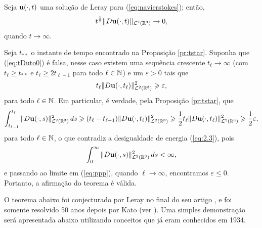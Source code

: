 \begin{tbox} \label{thm:Duto0}
    Seja $\mathbf{u}(\cdot,t)$ uma solução de Leray para (\ref{eq:navierstokes}); então,
    \begin{equation} \label{eq:tDuto0}
        t^{\frac{1}{2}} \Vert D\mathbf{u}(\cdot,t) \Vert_{\mathcal{L}^2(\mathbb{R}^3)} \to 0,
    \end{equation}
    quando $t \to \infty$.
\end{tbox}
\begin{prf}
    Seja $t_{**}$ o instante de tempo encontrado na Proposição \ref{pr:tstar}. Suponha que (\ref{eq:tDuto0}) é falsa, nesse caso existem uma sequência crescente $t_\ell \to \infty$ (com $t_\ell \geqslant t_{**}$ e $t_\ell \geqslant 2 t_{\ell -1}$ para todo $\ell \in \mathbb{N}$) e um $\varepsilon > 0$ tais que
    \[
        t_\ell \Vert D\mathbf{u}(\cdot,t_\ell) \Vert_{\mathcal{L}^2(\mathbb{R}^3)}^2 \geqslant \varepsilon,
    \]
    para todo $\ell \in \mathbb{N}$.
    Em particular, é verdade, pela Proposição \ref{pr:tstar}, que
    \begin{equation} \label{eq:ppp}
        \int_{t_{\ell-1}}^{t_\ell} \Vert D\mathbf{u}(\cdot,s) \Vert_{\mathcal{L}^2(\mathbb{R}^3)}^2 \,ds \geqslant (t_\ell - t_{\ell-1}) \Vert D\mathbf{u}(\cdot,t_\ell) \Vert_{\mathcal{L}^2(\mathbb{R}^3)}^2 \geqslant \frac{1}{2}t_\ell \Vert D\mathbf{u}(\cdot,t_\ell) \Vert_{\mathcal{L}^2(\mathbb{R}^3)}^2 \geqslant \frac{1}{2}\varepsilon,
    \end{equation}
    para todo $\ell \in \mathbb{N}$, o que contradiz a desigualdade de energia (\ref{eq:2.3}), pois
    \[
        \int_0^\infty \Vert D\mathbf{u}(\cdot,s) \Vert_{\mathcal{L}^2(\mathbb{R}^3)}^2 \,ds < \infty,
    \]
    e passando ao limite em (\ref{eq:ppp}), quando $\ell \to \infty$, encontramos $\varepsilon \leqslant 0$.
    Portanto, a afirmação do teorema é válida.
\end{prf}

O teorema abaixo foi conjecturado por Leray no final do seu artigo \cite{leray-fluid}, e foi somente resolvido 50 anos depois por Kato (ver \cite{kato-navier.stokes}). Uma simples demonstração será apresentada abaixo utilizando conceitos que já eram conhecidos em 1934.

